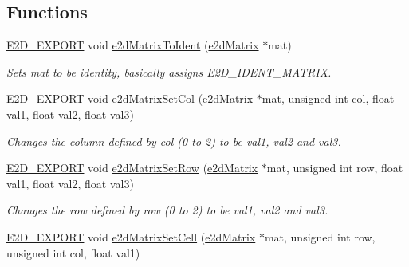 \subsection*{Functions}
\begin{DoxyCompactItemize}
\item 
\hypertarget{group__e2dMatrix_ga1e61b85d00e3cbc9a992f05d108939bb}{\hyperlink{Ez2DS_8h_a9f14e9cb869e1a85fdaba03afcca0df9}{E2\-D\-\_\-\-E\-X\-P\-O\-R\-T} void \hyperlink{group__e2dMatrix_ga1e61b85d00e3cbc9a992f05d108939bb}{e2d\-Matrix\-To\-Ident} (\hyperlink{structe2dMatrix}{e2d\-Matrix} $\ast$mat)}\label{group__e2dMatrix_ga1e61b85d00e3cbc9a992f05d108939bb}

\begin{DoxyCompactList}\small\item\em Sets mat to be identity, basically assigns E2\-D\-\_\-\-I\-D\-E\-N\-T\-\_\-\-M\-A\-T\-R\-I\-X. \end{DoxyCompactList}\item 
\hypertarget{group__e2dMatrix_ga6c239df52d28cf9b82236e0a71445359}{\hyperlink{Ez2DS_8h_a9f14e9cb869e1a85fdaba03afcca0df9}{E2\-D\-\_\-\-E\-X\-P\-O\-R\-T} void \hyperlink{group__e2dMatrix_ga6c239df52d28cf9b82236e0a71445359}{e2d\-Matrix\-Set\-Col} (\hyperlink{structe2dMatrix}{e2d\-Matrix} $\ast$mat, unsigned int col, float val1, float val2, float val3)}\label{group__e2dMatrix_ga6c239df52d28cf9b82236e0a71445359}

\begin{DoxyCompactList}\small\item\em Changes the column defined by col (0 to 2) to be val1, val2 and val3. \end{DoxyCompactList}\item 
\hypertarget{group__e2dMatrix_gae7ae18cff3a1feb5d62f3656a51a42d8}{\hyperlink{Ez2DS_8h_a9f14e9cb869e1a85fdaba03afcca0df9}{E2\-D\-\_\-\-E\-X\-P\-O\-R\-T} void \hyperlink{group__e2dMatrix_gae7ae18cff3a1feb5d62f3656a51a42d8}{e2d\-Matrix\-Set\-Row} (\hyperlink{structe2dMatrix}{e2d\-Matrix} $\ast$mat, unsigned int row, float val1, float val2, float val3)}\label{group__e2dMatrix_gae7ae18cff3a1feb5d62f3656a51a42d8}

\begin{DoxyCompactList}\small\item\em Changes the row defined by row (0 to 2) to be val1, val2 and val3. \end{DoxyCompactList}\item 
\hypertarget{group__e2dMatrix_ga0f0b522288e986b28742ae4d659c5085}{\hyperlink{Ez2DS_8h_a9f14e9cb869e1a85fdaba03afcca0df9}{E2\-D\-\_\-\-E\-X\-P\-O\-R\-T} void \hyperlink{group__e2dMatrix_ga0f0b522288e986b28742ae4d659c5085}{e2d\-Matrix\-Set\-Cell} (\hyperlink{structe2dMatrix}{e2d\-Matrix} $\ast$mat, unsigned int row, unsigned int col, float val1)}\label{group__e2dMatrix_ga0f0b522288e986b28742ae4d659c5085}


\end{DoxyCompactItemize}
